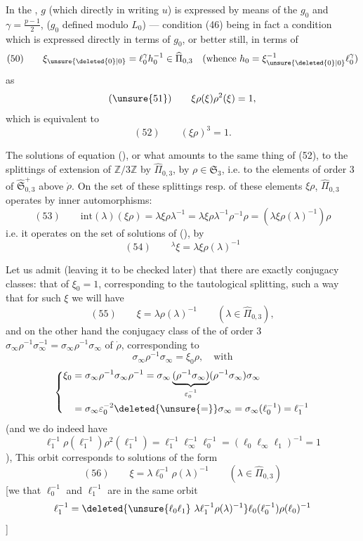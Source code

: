 \uline{} In the ,  $g$  (which  directly in writing $u$) is expressed by means of the $g_0$  and $\gamma=\frac{p-1}{2}$,  ($g_0$ defined modulo $L_0$) --- condition (46) being in fact a condition which is expressed directly in terms of $g_0$, or better still, in terms of
\[
(50)\qquad
\xi_{\unsure{\deleted{0}|0}}=\ell_0^\gamma h_0^{-1}\in\widehat{\Pi}_{0,3}
\quad\text{(whence }h_0=\xi_{\unsure{\deleted{0}|0}}^{-1}\ell_0^\gamma\text{)}
\]
as
\[
(\unsure{51})\qquad \xi\rho(\xi)\rho^2(\xi)=1,
\]
which is equivalent to
\[
(52)\qquad (\xi\rho)^3=1.
\]

The solutions of equation (), or what amounts to the same thing of (52),  to the splittings of  extension  of $\mathbb Z/3\mathbb Z$ by $\widehat{\Pi}_{0,3}$,  by $\rho\in\mathfrak S_3$,  i.e. to the elements of order 3 of $\widehat{\mathfrak S}_{0,3}^{+}$ above $\dot\rho$.
On the set of these splittings resp. of these elements $\xi\rho$, $\widehat{\Pi}_{0,3}$ operates by inner automorphisms:
\[
(53)\qquad
\mathrm{int}(\lambda)(\xi\rho)
=\lambda\xi\rho\lambda^{-1}
=\lambda\xi\rho\lambda^{-1}\rho^{-1}\rho
=(\lambda\xi\rho(\lambda)^{-1})\rho
\]
i.e. it operates on the set of solutions of (), by
\[
(54)\qquad {}^\lambda\xi=\lambda\xi\rho(\lambda)^{-1}
\]


Let us admit (leaving it to be checked later) that there are exactly  conjugacy classes: that of $\xi_0=1$, corresponding to the tautological splitting,  such a way that for such $\xi$ we will have
\[
(55)\qquad \xi=\lambda\rho(\lambda)^{-1}
\qquad(\lambda\in\widehat{\Pi}_{0,3}),
\]
and on the other hand the conjugacy class of the  of order 3 $\sigma_\infty\rho^{-1}\sigma_\infty^{-1}=\sigma_\infty\rho^{-1}\sigma_\infty$ of $\dot\rho$, corresponding to
\[
\sigma_\infty\rho^{-1}\sigma_\infty=\xi_0\rho,\quad\text{with}
\]
\[
\left\{\begin{aligned}
\xi_0&=\sigma_\infty\rho^{-1}\sigma_\infty\rho^{-1}
=\sigma_\infty\underbrace{(\rho^{-1}\sigma_\infty)}_{\varepsilon_0^{-1}}(\rho^{-1}\sigma_\infty)\sigma_\infty\\
&=\sigma_\infty\varepsilon_0^{-2}\deleted{\unsure{=}}\sigma_\infty
=\sigma_\infty(\ell_0^{-1})=\ell_1^{-1}
\end{aligned}\right.
\]
(and we do indeed have
\[
\ell_1^{-1}\rho(\ell_1^{-1})\rho^2(\ell_1^{-1})
=\ell_1^{-1}\ell_\infty^{-1}\ell_0^{-1}
=(\ell_0\ell_\infty\ell_1)^{-1}=1
\]
), This orbit corresponds to solutions of the form 
\[
(56)\qquad \xi=\lambda\ell_0^{-1}\rho(\lambda)^{-1}
\qquad(\lambda\in\widehat{\Pi}_{0,3})
\]
[we  that $\ell_0^{-1}$ and $\ell_1^{-1}$ are in the same orbit
\[
\ell_1^{-1}=\deleted{\unsure{\ell_0\ell_1}\ \lambda\ell_1^{-1}\rho(\lambda)^{-1}}
\ell_0(\ell_0^{-1})\rho(\ell_0)^{-1}
\]
]

